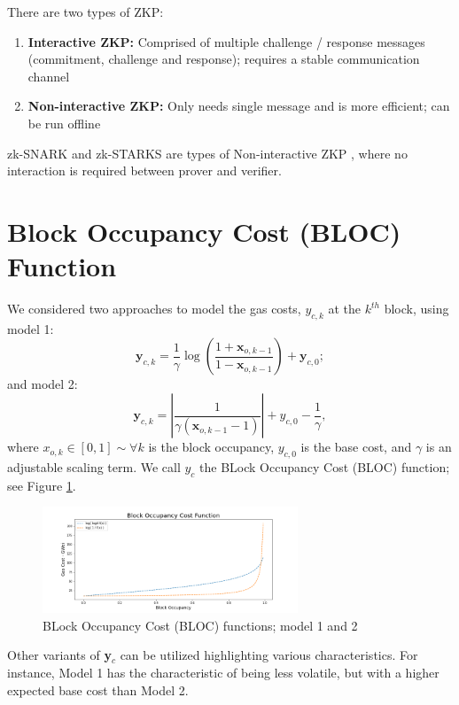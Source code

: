 \documentclass[peerreview]{ieeesyscoin}
\begin{document}
There are two types of ZKP:

\begin{enumerate}
\item \textbf{Interactive ZKP:} Comprised of multiple challenge / response messages (commitment, challenge and response); requires a stable communication channel
\item \textbf{Non-interactive ZKP:} Only needs single message and is more efficient; can be run offline
\end{enumerate}
zk-SNARK and zk-STARKS are types of Non-interactive ZKP , where no interaction is required between prover and verifier.

\section{Block Occupancy Cost (BLOC) Function}

We considered two approaches to model the gas costs, $y_{c,k}$ at the $k^{th}$ block, using model 1:
\begin{equation}
\mathbf{y}_{c,k} = \dfrac{1}{\gamma}\log\left(\dfrac{1+\mathbf{x}_{o,k-1}}{1-\mathbf{x}_{o,k-1}}\right) + \mathbf{y}_{c,0};
\end{equation}
and model 2:
\begin{equation}
\mathbf{y}_{c,k} = \left| \dfrac{1}{\gamma(\mathbf{x}_{o,k-1}-1)} \right| + y_{c,0} - \dfrac{1}{\gamma},
\end{equation}
where $x_{o,k} \in [0,1] \sim \forall k$ is the block occupancy, $y_{c,0}$ is the base cost, and $\gamma$ is an adjustable scaling term. We call $y_{c}$ the BLock Occupancy Cost (BLOC) function; see Figure \ref{fig:bloc}.

\begin{figure}[h!]
\includegraphics[width=3in]{img/blk_occupancy_cost_fn.png}
\caption{BLock Occupancy Cost (BLOC) functions; model 1 and 2} 
\label{fig:bloc}
\end{figure} 

Other variants of \textbf{y}$_{c}$ can be utilized highlighting various characteristics. For instance, Model 1 has the characteristic of being less volatile, but with a higher expected base cost than Model 2.
\end{document}
